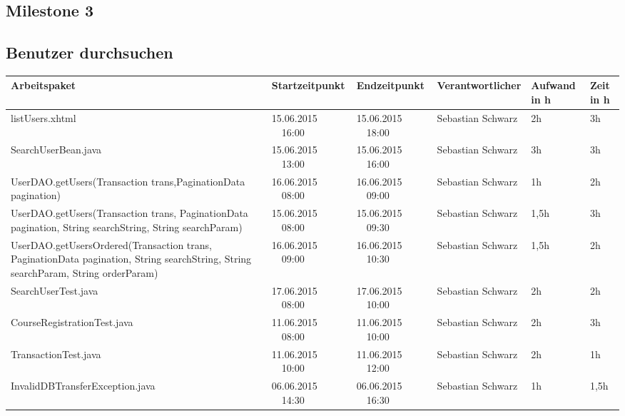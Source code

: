 \begin{landscape}
	\section{Milestone 3}	
	
	\subsection{Benutzer durchsuchen}
	\begin{tabular}{|p{10.3cm}|p{3.2cm}|p{3.2cm}|p{3.5cm}|p{1.7cm}|p{1.5cm}|}
		\hline  \textbf{Arbeitspaket} & \textbf{Startzeitpunkt} & \textbf{Endzeitpunkt} & \textbf{Verantwortlicher}  & \textbf{Aufwand in h} & \textbf{Zeit in h}\\ 
		\hline   listUsers.xhtml                                               & 15.06.2015 \ \ 16:00       & 15.06.2015 \ \ 18:00      & Sebastian Schwarz  & 2h       & 3h\\  
		\hline   SearchUserBean.java                                           & 15.06.2015 \ \ 13:00       & 15.06.2015 \ \ 16:00        & Sebastian Schwarz & 3h                 & 3h\\  
		\hline   UserDAO.getUsers(Transaction trans,PaginationData pagination) & 16.06.2015 \ \ 08:00       & 16.06.2015 \ \ 09:00        & Sebastian Schwarz & 1h                 & 2h\\  
		\hline   UserDAO.getUsers(Transaction trans, PaginationData pagination, String searchString, String searchParam) & 15.06.2015 \ \ 08:00       & 15.06.2015 \ \ 09:30       & Sebastian Schwarz  & 1,5h                 & 3h\\  
		\hline   UserDAO.getUsersOrdered(Transaction trans, PaginationData pagination, String searchString, String searchParam, String orderParam)    & 16.06.2015 \ \ 09:00       & 16.06.2015 \ \ 10:30 & Sebastian Schwarz & 1,5h                 & 2h\\  
		\hline SearchUserTest.java      &   17.06.2015 \ \ 08:00         &  17.06.2015 \ \ 10:00          & Sebastian Schwarz &        2h           &  2h\\  
		\hline   CourseRegistrationTest.java &  11.06.2015 \ \ 08:00       & 11.06.2015 \ \ 10:00       & Sebastian Schwarz   & 2h                 & 3h\\  
		\hline   TransactionTest.java    &  11.06.2015 \ \ 10:00       & 11.06.2015 \ \ 12:00           & Sebastian Schwarz   & 2h                 & 1h\\  
		\hline   InvalidDBTransferException.java                       & 06.06.2015  \ \ 14:30       & 06.06.2015 \ \ 16:30        & Sebastian Schwarz  &  1h      & 1,5h\\
	    \hline
	

\end{tabular}
\end{landscape}
